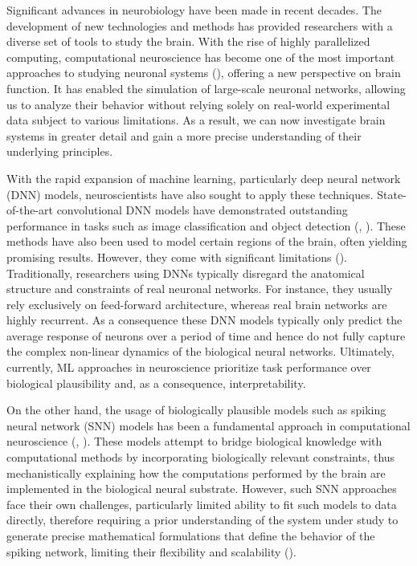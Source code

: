 
Significant advances in neurobiology have been made in recent decades. 
The development of new technologies and
methods has provided researchers with a diverse set of tools to
study the brain. With the rise of highly parallelized computing, 
computational neuroscience has become one of the most important
approaches to studying neuronal systems (\citet{trappenberg2009fundamentals}), 
offering a new perspective on
brain function. It has enabled the simulation of large-scale neuronal
networks, allowing us to analyze their behavior without relying solely
on real-world experimental data subject to various limitations. As a result, we can
now investigate brain systems in greater detail and gain a more precise
understanding of their underlying principles.

With the rapid expansion of machine learning, particularly deep neural
network (DNN) models, neuroscientists have also sought to apply these techniques.
State-of-the-art convolutional DNN models have demonstrated outstanding
performance in tasks such as image classification and object detection
(\citet{krizhevsky2012imagenet}, \citet{li2014medical}). 
These methods have also been used to model certain regions of the brain, often
yielding promising results. However, they come
with significant limitations (\citet{celeghin2023convolutional}).
Traditionally, researchers using DNNs typically disregard the anatomical structure
and constraints of real neuronal networks. For instance, they usually rely exclusively on feed-forward architecture, whereas real brain networks are highly recurrent. As a consequence these DNN models typically only predict the average response of neurons over a period of time and hence do not fully capture the complex non-linear dynamics of the biological neural networks. Ultimately, currently, ML approaches in neuroscience prioritize task performance over biological plausibility and, as a consequence, interpretability.

On the other hand, the usage of biologically plausible models such as
spiking neural network (SNN) models has been a fundamental approach in computational
neuroscience (\citet{ghosh2009spiking}, \citet{yamazaki2022spiking}). 
These models attempt to bridge biological knowledge with computational
methods by incorporating biologically relevant constraints, thus mechanistically explaining how the computations performed by the brain are implemented in the biological neural substrate. However, such SNN approaches face their own challenges, particularly limited ability to fit such models to data directly, therefore requiring a prior understanding of the system under study to generate precise mathematical formulations that define the behavior of the spiking network, limiting their flexibility and scalability (\citet{izhikevich2004model}).

